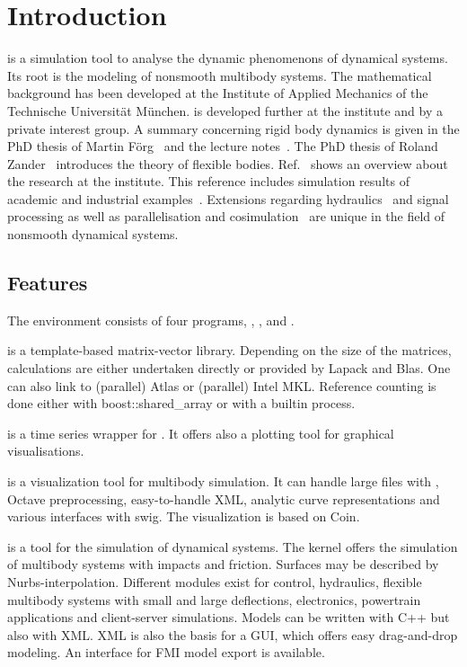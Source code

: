 \section{Introduction}
\MBSim{} is a simulation tool to analyse the dynamic phenomenons of dynamical systems. Its root is the modeling of nonsmooth multibody systems. The mathematical background has been developed at the Institute of Applied Mechanics of the Technische Universit\"at M\"unchen. \MBSim{} is developed further at the institute and by a private interest group. A summary concerning rigid body dynamics is given in the PhD thesis of Martin F\"org~\cite{Foer07} and the lecture notes~\cite{Sch14c}. The PhD thesis of Roland Zander~\cite{Zan09} introduces the theory of flexible bodies. Ref.~\cite{Zan08} shows an overview about the research at the institute. This reference includes simulation results of academic and industrial examples~\cite{Ceb14,Gru15,Sch10}. Extensions regarding hydraulics~\cite{Sch12g} and signal processing as well as parallelisation and cosimulation~\cite{Fri11,Cla13} are unique in the field of nonsmooth dynamical systems.
%
\subsection{Features}
The \MBSim{} environment consists of four programs, \MBSim{}, \OpenMBV{}, \HDFSerie{} and \FMatVec{}.\par
%
\FMatVec{} is a template-based matrix-vector library. Depending on the size of the matrices, calculations are either undertaken directly or provided by Lapack and Blas. One can also link to (parallel) Atlas or (parallel) Intel MKL. Reference counting is done either with boost::shared\_array or with a builtin process.\par
%
\HDFSerie{} is a time series wrapper for \HDF. It offers also a plotting tool for graphical visualisations.\par
%
\OpenMBV{} is a visualization tool for multibody simulation. It can handle large files with \HDF, Octave preprocessing, easy-to-handle XML, analytic curve representations and various interfaces with swig. The visualization is based on Coin.\par
%
\MBSim{} is a tool for the simulation of dynamical systems. The kernel offers the simulation of multibody systems with impacts and friction. Surfaces may be described by Nurbs-interpolation. Different modules exist for control, hydraulics, flexible multibody systems with small and large deflections, electronics, powertrain applications and client-server simulations. Models can be written with C++ but also with XML. XML is also the basis for a GUI, which offers easy drag-and-drop modeling. An interface for FMI model export is available.
%
